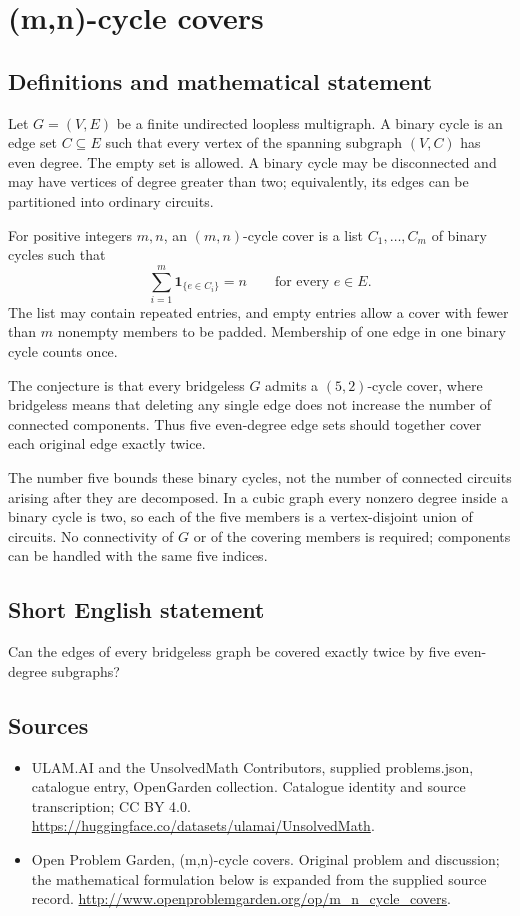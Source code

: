 \documentclass[11pt,a4paper]{article}
\begin{document}
\section*{(m,n)-cycle covers}\label{statement}

\subsection{Definitions and mathematical statement}
Let $G=(V,E)$ be a finite undirected loopless multigraph.
A binary cycle is an edge set $C\subseteq E$ such that every
vertex of the spanning subgraph $(V,C)$ has even degree.
The empty set is allowed. A binary cycle may be disconnected
and may have vertices of degree greater than two; equivalently,
its edges can be partitioned into ordinary circuits.

For positive integers $m,n$, an $(m,n)$-cycle cover is a list
$C_1,\ldots,C_m$ of binary cycles such that
\[
 \sum_{i=1}^m\mathbf1_{\{e\in C_i\}}=n
 \qquad\text{for every }e\in E.
\]
The list may contain repeated entries, and empty entries allow
a cover with fewer than $m$ nonempty members to be padded.
Membership of one edge in one binary cycle counts once.

The conjecture is that every bridgeless $G$ admits a
$(5,2)$-cycle cover, where bridgeless means that deleting any
single edge does not increase the number of connected
components. Thus five even-degree edge sets should together
cover each original edge exactly twice.

The number five bounds these binary cycles, not the number
of connected circuits arising after they are decomposed.
In a cubic graph every nonzero degree inside a binary cycle
is two, so each of the five members is a vertex-disjoint union
of circuits. No connectivity of $G$ or of the covering members
is required; components can be handled with the same five
indices.
\subsection{Short English statement}
Can the edges of every bridgeless graph be covered exactly twice by five even-degree subgraphs?
\subsection{Sources}
\begin{itemize}
\item[S1] ULAM.AI and the UnsolvedMath Contributors, supplied problems.json, catalogue entry, OpenGarden collection. Catalogue identity and source transcription; CC BY 4.0.
\url{https://huggingface.co/datasets/ulamai/UnsolvedMath}.
\item[S2] Open Problem Garden, (m,n)-cycle covers. Original problem and discussion; the mathematical formulation below is expanded from the supplied source record.
\url{http://www.openproblemgarden.org/op/m_n_cycle_covers}.
\end{itemize}
\end{document}
